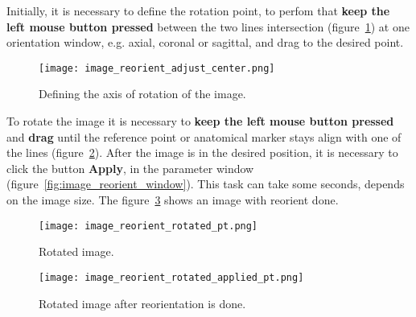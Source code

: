 Initially, it is necessary to define the rotation point, to perfom that \textbf{keep the left mouse button pressed} between the two lines intersection (figure~\ref{fig:image_reorient_adjust_center}) at one orientation window, e.g. axial, coronal or sagittal, and drag to the desired point.

\begin{figure}[!htb]
\centering
\texttt{[image: image\_reorient\_adjust\_center.png]}
\caption{Defining the axis of rotation of the image.}
\label{fig:image_reorient_adjust_center}
\end{figure}

To rotate the image it is necessary to \textbf{keep the left mouse button pressed} and \textbf{drag} until the reference point or anatomical marker stays align with one of the lines (figure~\ref{fig:image_reorient_rotated}). After the image is in the desired position, it is necessary to click the button \textbf{Apply}, in the parameter window (figure~\ref{fig:image_reorient_window}). This task can take some seconds, depends on the image size. The figure~\ref{fig:image_reorient_rotated_applied} shows an image with reorient done.

\begin{figure}[!htb]
\centering
\texttt{[image: image\_reorient\_rotated\_pt.png]}
\caption{Rotated image.}
\label{fig:image_reorient_rotated}
\end{figure}

\begin{figure}[!htb]
\centering
\texttt{[image: image\_reorient\_rotated\_applied\_pt.png]}
\caption{Rotated image after reorientation is done.}
\label{fig:image_reorient_rotated_applied}
\end{figure}






